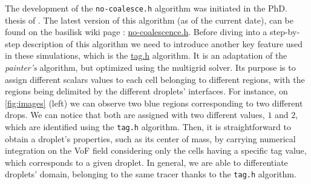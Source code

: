 The development of the \texttt{no-coalesce.h} algorithm was initiated in the PhD. thesis of \citet{mani2021numerical}.
The latest version of this algorithm (as of the current date), can be found on the basilisk wiki page : \href{http://basilisk.fr/sandbox/fintzin/Rising-Suspenion/no-coalescence.h}{no-coalescence.h}.
Before  diving into a step-by-step description of this algorithm we need to introduce another key feature used in these simulations, which is the \href{http://basilisk.fr/src/tag.h}{tag.h} algorithm. 
It is an adaptation of the \textit{painter’s} algorithm, but optimized using the multigrid solver. 
Its purpose is to assign different scalars values to each cell belonging to different regions, with the regions being delimited by the different droplets' interfaces. 
For instance, on \ref{fig:images} (left) we can observe two blue regions corresponding to two different drops.
We can notice that both are assigned with two different values, $1$ and $2$, which are identified using the \texttt{tag.h} algorithm. 
Then, it is straightforward to obtain a droplet's properties, such as its center of mass, by carrying numerical integration on the VoF field considering only the cells having a specific tag value, which corresponds to a given droplet.  
In general, we are able to differentiate droplets' domain, belonging to the same tracer thanks to the \texttt{tag.h} algorithm. 

